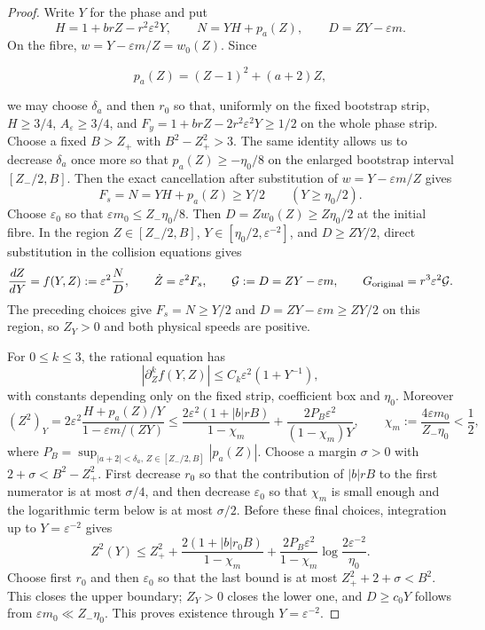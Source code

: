 \begin{proof}
Write $Y$ for the phase and put
\[
 H=1+brZ-r^2\varepsilon^2Y,
 \qquad N=YH+p_a(Z),
 \qquad D=ZY-\varepsilon m.
\]
On the fibre, $w=Y-\varepsilon m/Z=w_0(Z)$.  Since

\[
 p_a(Z)=(Z-1)^2+(a+2)Z,
\]

we may choose $\delta_a$ and then $r_0$ so that, uniformly on the fixed
bootstrap strip,
$H\ge3/4$, $A_\varepsilon\ge3/4$, and
$F_y=1+brZ-2r^2\varepsilon^2Y\ge1/2$ on the whole phase strip.
Choose a fixed $B>Z_+$ with $B^2-Z_+^2>3$. The same identity allows
us to decrease $\delta_a$ once more so that
$p_a(Z)\ge-\eta _0/8$ on the enlarged bootstrap interval
$[Z_-/2,B]$.  Then the exact cancellation after
substitution of $w=Y-\varepsilon m/Z$ gives
\[
 F_s=N=YH+p_a(Z)\ge Y/2\qquad(Y\ge\eta _0/2).
\]
Choose $\varepsilon _0$ so that $\varepsilon m_0\le Z_-\eta _0/8$.
Then $D=Zw_0(Z)\ge Z\eta _0/2$ at the initial fibre.  In the region
$Z\in[Z_-/2,B]$, $Y\in[\eta _0/2,\varepsilon^{-2}]$, and
$D\ge ZY/2$, direct substitution in the collision equations gives
\[
 \frac{dZ}{dY}=f(Y,Z):=\varepsilon^2\frac{N}{D},
 \qquad \dot Z=\varepsilon^2F_s,
 \qquad \mathcal G:=D=ZY-\varepsilon m,
 \qquad G_{\rm original}=r^3\varepsilon^2\mathcal G.
\]
The preceding choices give $F_s=N\ge Y/2$ and
$D=ZY-\varepsilon m\ge ZY/2$ on this region, so $Z_Y>0$ and both
physical speeds are positive.

For $0\le k\le3$, the rational equation has
\[
 |\partial_Z^k f(Y,Z)|\le C_k\varepsilon^2(1+Y^{-1}),
\]
with constants depending only on the fixed strip, coefficient box and
$\eta_0$.
Moreover
\[
 (Z^2)_Y=2\varepsilon^2
 \frac{H+p_a(Z)/Y}{1-\varepsilon m/(ZY)}
 \le \frac{2\varepsilon^2(1+|b|rB)}{1-\chi_m}
       +\frac{2P_B\varepsilon^2}{(1-\chi_m)Y},
 \qquad
 \chi_m:=\frac{4\varepsilon m_0}{Z_-\eta _0}<\frac12,
\]
where $P_B=\sup_{|a+2|<\delta_a,\,Z\in[Z_-/2,B]}|p_a(Z)|$.
Choose a margin $\sigma>0$ with
$2+\sigma<B^2-Z_+^2$.  First decrease $r_0$ so that the contribution of
$|b|rB$ to the first numerator is at most $\sigma/4$, and then decrease
$\varepsilon_0$ so that $\chi_m$ is small enough and the logarithmic term
below is at most $\sigma/2$.  Before these final choices, integration up to
$Y=\varepsilon^{-2}$ gives
\[
 Z^2(Y)\le Z_+^2+
 \frac{2(1+|b|r_0B)}{1-\chi_m}
 +\frac{2P_B\varepsilon^2}{1-\chi_m}
   \log\frac{2\varepsilon^{-2}}{\eta_0}.
\]
Choose first $r_0$ and then $\varepsilon_0$ so that the last bound is
at most $Z_+^2+2+\sigma<B^2$. This closes the upper boundary;
$Z_Y>0$ closes the lower one, and $D\ge c_0Y$ follows from
$\varepsilon m_0\ll Z_-\eta_0$.
This proves existence through $Y=\varepsilon^{-2}$.


\end{proof}
